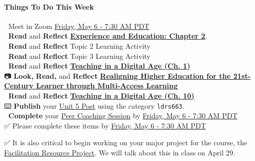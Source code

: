 \documentclass[
]{book}
\begin{document}
\begin{todo}
\hypertarget{things-to-do-this-week}{%
\paragraph{Things To Do This Week}\label{things-to-do-this-week}}

👥 Meet in Zoom
\href{https://www.timeanddate.com/worldclock/fixedtime.html?msg=LDRS663+Class+Meeting\&iso=20220506T0730\&p1=1109\&ah=1\&am=30}{Friday,
May 6 - 7:30 AM PDT}\\
📖 \textbf{Read} and \textbf{Reflect}
\href{http://ruby.fgcu.edu/courses/ndemers/colloquium/experienceducationdewey.pdf}{\textbf{Experience
and Education: Chapter 2}}.\\
📖 \textbf{Read} and \textbf{Reflect} Topic 2 Learning Activity\\
📖 \textbf{Read} and \textbf{Reflect} Topic 3 Learning Activity\\
📖 \textbf{Read} and \textbf{Reflect}
\href{https://pressbooks.bccampus.ca/teachinginadigitalagev2/part/chapter-1-fundamental-change-in-education/}{\textbf{Teaching
in a Digital Age (Ch. 1)}}\\
📷 \textbf{Look,} \textbf{Read,} and \textbf{Reflect}
\href{https://jolt.merlot.org/vol9no2/irvine_0613.htm}{\textbf{Realigning
Higher Education for the 21st-Century Learner through Multi-Access
Learning}}\\
📖 \textbf{Read} and \textbf{Reflect}
\href{https://pressbooks.bccampus.ca/teachinginadigitalagev2/part/chapter-10-modes-of-delivery/}{\textbf{Teaching
in a Digital Age (Ch. 10)}}\\
⌨️ \textbf{Publish} your
\href{https://far.twu.ca/ldrs/663202109/assignments}{Unit 5 Post} using
the category \texttt{ldrs663}.\\
👥 \textbf{Complete} your
\href{https://far.twu.ca/ldrs/663202109/assignments}{Peer Coaching
Session} by
\href{https://www.timeanddate.com/worldclock/fixedtime.html?msg=LDRS663+Class+Meeting\&iso=20220506T0730\&p1=1109\&ah=1\&am=30}{Friday,
May 6 - 7:30 AM PDT}\\
✅ Please complete these items by
\href{https://www.timeanddate.com/worldclock/fixedtime.html?msg=LDRS663+Class+Meeting\&iso=20220506T0730\&p1=1109\&ah=1\&am=30}{Friday,
May 6 - 7:30 AM PDT}

✅ It is also critical to begin working on your major project for the
course, the
\href{https://ma-lead.github.io/ldrs663/assessments.html\#facilitation-resource-project-40}{Facilitation
Resource Project}. We will talk about this in class on April 29.
\end{todo}
\end{document}
